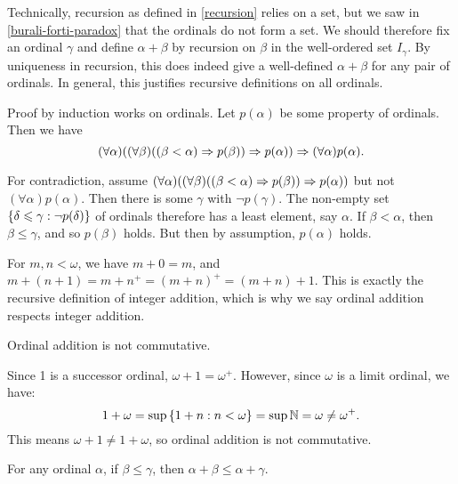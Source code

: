 \documentclass{article}
\begin{document}
\begin{note}
	Technically, recursion as defined in \ref{recursion} relies on a set, but we saw in \ref{burali-forti-paradox} that the ordinals do not form a set. We should therefore fix an ordinal $\gamma$ and define $\alpha + \beta$ by recursion on $\beta$ in the well-ordered set $I_\gamma$. By uniqueness in recursion, this does indeed give a well-defined $\alpha + \beta$ for any pair of ordinals. In general, this justifies recursive definitions on all ordinals.
\end{note}

\begin{proposition}
    Proof by induction works on ordinals. Let $p(\alpha)$ be some property of ordinals. Then we have
    \[
	(\forall \alpha) ((\forall \beta)((\beta < \alpha) \Rightarrow p(\beta)) \Rightarrow p(\alpha)) \Rightarrow (\forall \alpha) p(\alpha).
	\]
\end{proposition}

\begin{prf}
    For contradiction, assume $(\forall \alpha) ((\forall \beta)((\beta < \alpha) \Rightarrow p(\beta)) \Rightarrow p(\alpha))$ but not $(\forall \alpha) p(\alpha)$. Then there is some $\gamma$ with $\lnot p(\gamma)$. The non-empty set $\left\lbrace \delta \leqslant \gamma : \lnot p(\delta) \right\rbrace$ of ordinals therefore has a least element, say $\alpha$. If $\beta < \alpha$, then $\beta \leq \gamma$, and so $p(\beta)$ holds. But then by assumption, $p(\alpha)$ holds.
\end{prf}

\begin{note}
	For $m, n < \omega$, we have $m + 0 = m$, and $m + (n+1) = m + n^+ = (m+n)^+ = (m+n)+1$. This is exactly the recursive definition of integer addition, which is why we say ordinal addition respects integer addition.
\end{note}

\begin{proposition}[Noncommutativity]
    Ordinal addition is not commutative.
\end{proposition}

\begin{prf}
    Since 1 is a successor ordinal, $\omega + 1 = \omega^+$. However, since $\omega$ is a limit ordinal, we have:
    \[
	1 + \omega = \sup\left\lbrace 1 + n : n < \omega \right\rbrace = \sup \mathbb{N} = \omega \neq \omega^+.
	\]
	This means $\omega + 1 \neq 1 + \omega$, so ordinal addition is not commutative.
\end{prf}

\begin{proposition}
	\label{ordinal-addition-respects-inequality}
    For any ordinal $\alpha$, if $\beta \leq \gamma$, then $\alpha + \beta \leq \alpha + \gamma$.
\end{proposition}
\end{document}
